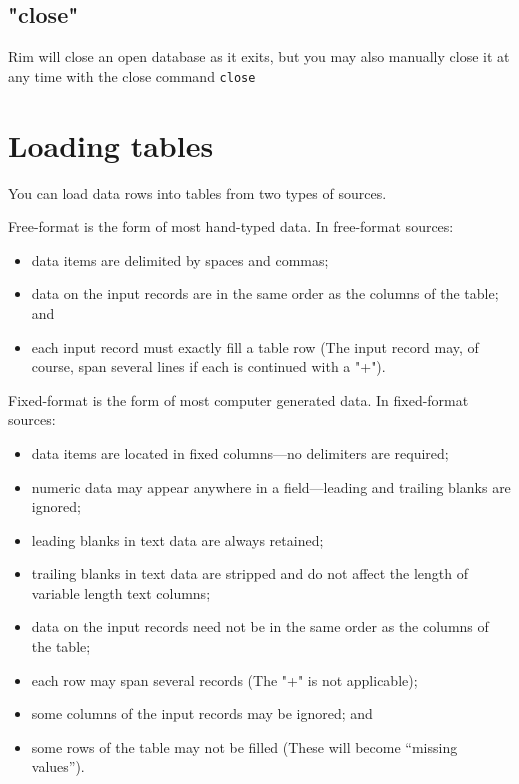 \documentclass[11pt,a4paper]{report}
\def\I{\index}
\begin{document}
\I{close@"close"}
\subsection{"close"}
Rim will close an open database as it exits, but you
may also manually close it at any time with the close
command
\verb|close|
 
 
\section{Loading tables}
%
\I{load@"load"|(}
You can load data rows into tables from two types of sources.
 
\begin{List}
\item[Free-format] is the form of most hand-typed data.
  In free-format sources:
  \begin{itemize}
  \item data items are delimited by spaces and commas;
  \item data on the input records are in the same order as
     the columns of the table; and
  \item each input record must exactly fill a table row (The
     input record may, of course, span several lines if each
     is continued with a "+").
  \end{itemize}
\item[Fixed-format] is the form of most computer generated data.
  In fixed-format sources:
  \begin{itemize}
  \item data items are located in fixed columns---no delimiters
     are required;
  \item numeric data may appear anywhere in a field---leading and
     trailing blanks are ignored;
  \item leading blanks in text data are always retained;
  \item trailing blanks in text data are stripped and do not
     affect the length of variable length text columns;
  \item data on the input records need not be in the same order as
     the columns of the table;
  \item each row may span several records (The "+" is not applicable);
  \item some columns of the input records may be ignored;   and
  \item some rows of the table may not be filled (These will become
     ``missing values'').
  \end{itemize}
\end{List}
 
\end{document}
